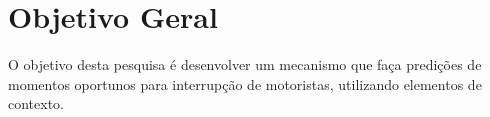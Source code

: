 \chapter{Objetivo Geral}

O objetivo desta pesquisa é desenvolver um mecanismo que faça predições de momentos oportunos para interrupção de
motoristas, utilizando elementos de contexto.

